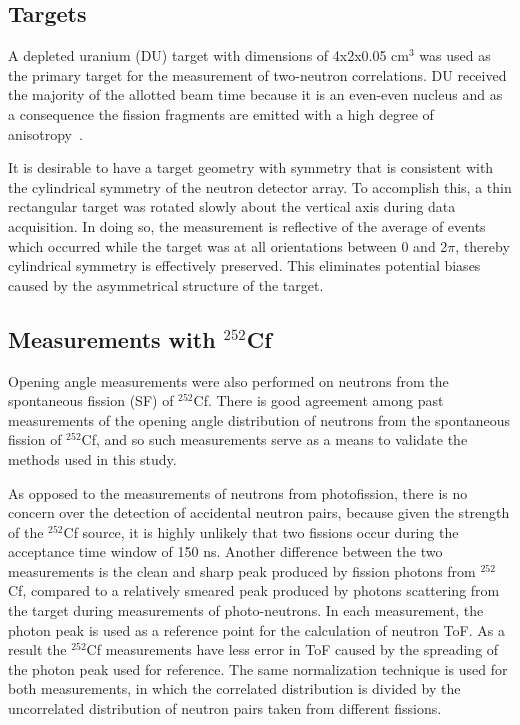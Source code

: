 \subsection{Targets}
A depleted uranium (DU) target with dimensions of 4x2x0.05 $\text{cm}^3$ was used as the primary target for the measurement of two-neutron correlations.
DU received the majority of the allotted beam time because it is an even-even nucleus and as a consequence the fission fragments are emitted with a high degree of anisotropy~\cite{1977FragAss}.

It is desirable to have a target geometry with symmetry that is consistent with the cylindrical symmetry of the neutron detector array.
To accomplish this, a thin rectangular target was rotated slowly about the vertical axis during data acquisition.
In doing so, the measurement is reflective of the average of events which occurred while the target was at all orientations between 0 and 2$\pi$, thereby cylindrical symmetry is effectively preserved.
This eliminates potential biases caused by the asymmetrical structure of the target.

\subsection{Measurements with $^{252}$Cf}

Opening angle measurements were also performed on neutrons from the spontaneous fission (SF) of $^{252}$Cf.
There is good agreement among past measurements of the opening angle distribution of neutrons from the spontaneous fission of $^{252}$Cf, and so such measurements serve as a means to validate the methods used in this study.

As opposed to the measurements of neutrons from photofission, there is no concern over the detection of accidental neutron pairs, because given the strength of the $^{252}$Cf source, it is highly unlikely that two fissions occur during the acceptance time window of 150 ns.
Another difference between the two measurements is the clean and sharp peak produced by fission photons from $^{252}$Cf, compared to a relatively smeared peak produced by photons scattering from the target during measurements of photo-neutrons.
In each measurement, the photon peak is used as a reference point for the calculation of neutron ToF.
As a result the $^{252}$Cf measurements have less error in ToF caused by the spreading of the photon peak used for reference.
The same normalization technique is used for both measurements, in which the correlated distribution is divided by the uncorrelated distribution of neutron pairs taken from different fissions.

